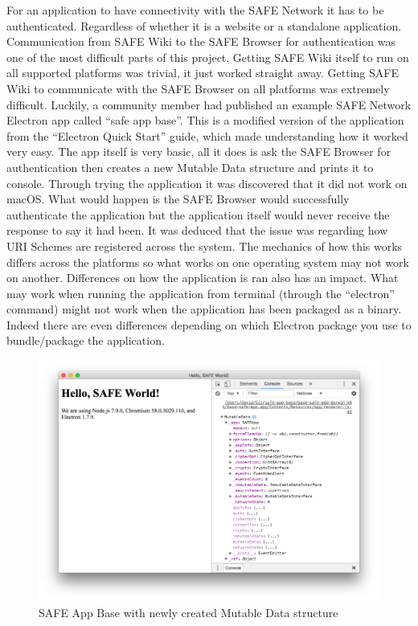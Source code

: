For an application to have connectivity with the SAFE Network it has to be authenticated. Regardless of whether it is a website or a standalone application. Communication from SAFE Wiki to the SAFE Browser for authentication was one of the most difficult parts of this project. Getting SAFE Wiki itself to run on all supported platforms was trivial, it just worked straight away. Getting SAFE Wiki to communicate with the SAFE Browser on all platforms was extremely difficult. Luckily, a community member had published an example SAFE Network Electron app called ``safe app base''\cite{safe-app-base}. This is a modified version of the application from the ``Electron Quick Start'' guide\cite{electron-quick-start}, which made understanding how it worked very easy. The app itself is very basic, all it does is ask the SAFE Browser for authentication then creates a new Mutable Data structure and prints it to console. Through trying the application it was discovered that it did not work on macOS. What would happen is the SAFE Browser would successfully authenticate the application but the application itself would never receive the response to say it had been. It was deduced that the issue was regarding how URI Schemes are registered across the system. The mechanics of how this works differs across the platforms so what works on one operating system may not work on another. Differences on how the application is ran also has an impact. What may work when running the application from terminal (through the ``electron'' command) might not work when the application has been packaged as a binary. Indeed there are even differences depending on which Electron package you use to bundle/package the application.

\begin{figure}[h]
	\begin{center}
		\includegraphics[width=\textwidth]{images/safe-app-base}
		\caption{SAFE App Base with newly created Mutable Data structure}
		\label{fig:safe-app-base}
	\end{center}
\end{figure}

